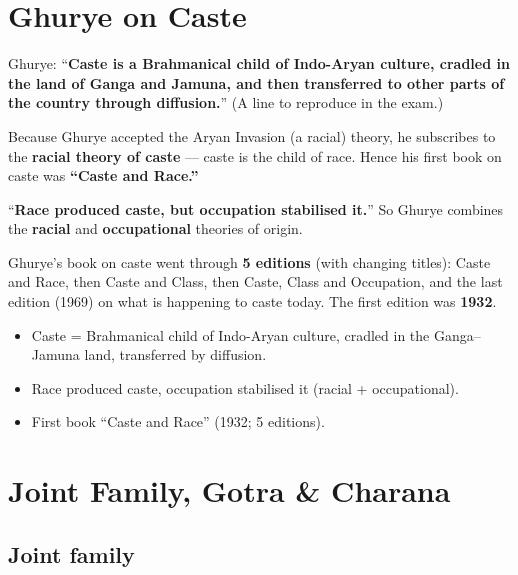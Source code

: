 \section{Ghurye on Caste}

\begin{KeyConcept}
Ghurye: ``\textbf{Caste is a Brahmanical child of Indo-Aryan culture, cradled in the land of Ganga and Jamuna, and then transferred to other parts of the country through diffusion.}'' (A line to reproduce in the exam.)
\end{KeyConcept}

\begin{CriticalPoint}
Because Ghurye accepted the Aryan Invasion (a racial) theory, he subscribes to the \textbf{racial theory of caste} --- caste is the child of race. Hence his first book on caste was \textbf{``Caste and Race.''}
\end{CriticalPoint}

\begin{KeyConcept}
``\textbf{Race produced caste, but occupation stabilised it.}'' So Ghurye combines the \textbf{racial} and \textbf{occupational} theories of origin.
\end{KeyConcept}

\begin{DataFact}
Ghurye's book on caste went through \textbf{5 editions} (with changing titles): Caste and Race, then Caste and Class, then Caste, Class and Occupation, and the last edition (1969) on what is happening to caste today. The first edition was \textbf{1932}.
\end{DataFact}

\begin{QuickRevision}
\begin{itemize}
\item Caste = Brahmanical child of Indo-Aryan culture, cradled in the Ganga--Jamuna land, transferred by diffusion.
\item Race produced caste, occupation stabilised it (racial + occupational).
\item First book ``Caste and Race'' (1932; 5 editions).
\end{itemize}
\end{QuickRevision}

\section{Joint Family, Gotra \& Charana}

\subsection{Joint family}

